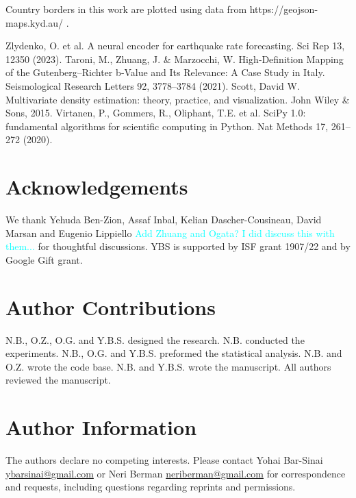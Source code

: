 \documentclass[pdflatex]{sn-jnl}
\newcommand{\neri}[1]{{\textcolor{cyan}{#1}}}
\begin{document}
Country borders in this work are plotted using data from https://geojson-maps.kyd.au/ .

\newpage
\renewcommand\refname{Methods References}
\begin{thebibliography}{10}
Zlydenko, O. et al. A neural encoder for earthquake rate forecasting. Sci Rep 13, 12350 (2023).
Taroni, M., Zhuang, J. \& Marzocchi, W. High‐Definition Mapping of the Gutenberg–Richter b‐Value and Its Relevance: A Case Study in Italy. Seismological Research Letters 92, 3778–3784 (2021).
Scott, David W. Multivariate density estimation: theory, practice, and visualization. John Wiley \& Sons, 2015.  
Virtanen, P., Gommers, R., Oliphant, T.E. et al. SciPy 1.0: fundamental algorithms for scientific computing in Python. Nat Methods 17, 261–272 (2020).





\end{thebibliography}


\newpage
\section*{Acknowledgements}
We thank Yehuda Ben-Zion, Assaf Inbal, Kelian Dascher-Cousineau, David Marsan and Eugenio Lippiello \neri{Add Zhuang and Ogata? I did discuss this with them...} for thoughtful discussions. YBS is supported by ISF grant 1907/22 and by Google Gift grant.

\section*{Author Contributions}
N.B., O.Z., O.G. and Y.B.S. designed the research. N.B. conducted the experiments. N.B., O.G. and Y.B.S. preformed the statistical analysis. N.B. and O.Z. wrote the code base. N.B. and Y.B.S. wrote the manuscript. All authors reviewed the manuscript.

\section*{Author Information}
The authors declare no competing interests. Please contact Yohai Bar-Sinai \href{mailto:ybarsinai@gmail.com}{ybarsinai@gmail.com} or Neri Berman \href{mailto:neriberman@gmail.com}{neriberman@gmail.com} for correspondence and requests, including questions regarding reprints and permissions.
\end{document}
